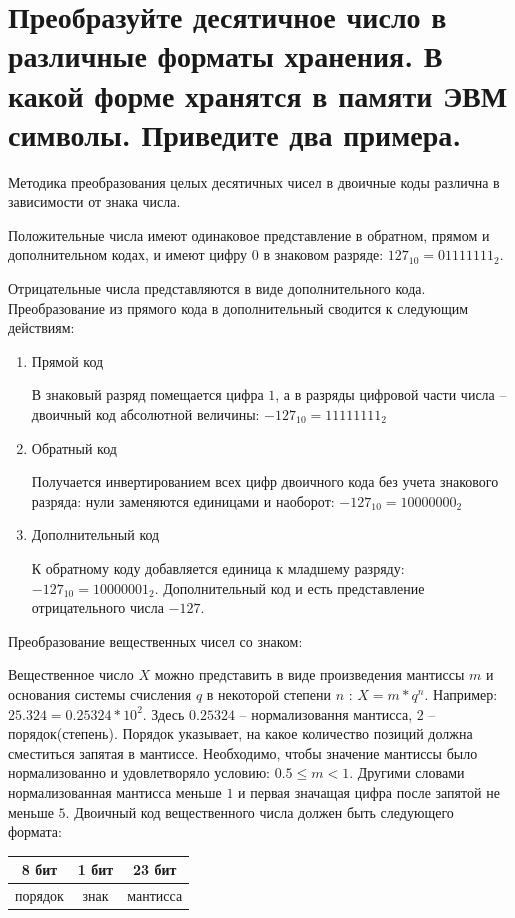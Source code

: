 \documentclass[unicode, 12pt, a4paper, oneside]{article}
\begin{document}
\section{Преобразуйте десятичное число в различные форматы хранения. В какой форме хранятся в памяти ЭВМ символы. Приведите два примера.}

Методика преобразования целых десятичных чисел в двоичные коды различна в зависимости от знака числа.

Положительные числа имеют одинаковое представление в обратном, прямом и дополнительном кодах, и имеют цифру $ 0 $ в знаковом разряде: $ 127_{10}=01111111_{2} $.

Отрицательные числа представляются в виде дополнительного кода. Преобразование из прямого кода в дополнительный сводится к следующим действиям:
\begin{enumerate}
\item Прямой код

В знаковый разряд помещается цифра $ 1 $, а в разряды цифровой части числа – двоичный код абсолютной величины: $ -127_{10}=11111111_{2} $
\item Обратный код

Получается инвертированием всех цифр двоичного кода без учета знакового разряда: нули заменяются единицами и наоборот: $ -127_{10}=10000000_{2} $
\item Дополнительный код

К обратному коду добавляется единица к младшему разряду: $ -127_{10}=10000001_{2} $.
Дополнительный код и есть представление отрицательного числа $ -127 $.
\end{enumerate}  

Преобразование вещественных чисел со знаком:

Вещественное число $ X $ можно представить в виде произведения мантиссы $ m $ и основания системы счисления $ q $ в некоторой степени $ n $ : $ X=m \ast q^{n} $. 
Например: $ 25.324 = 0.25324\ast 10^{2} $. Здесь $ 0.25324 $ – нормализовання мантисса, $ 2 $ – порядок(степень). Порядок указывает, на какое количество позиций должна сместиться запятая в мантиссе. Необходимо, чтобы значение мантиссы было нормализованно и удовлетворяло условию: $ 0.5 \leq m < 1 $. Другими словами нормализованная мантисса меньше $ 1 $ и первая значащая цифра после запятой не меньше $ 5 $. 
Двоичный код вещественного числа должен быть следующего формата:

\begin{center}
\begin{tabular}{|c|c|c|}
\hline 8 бит   & 1 бит & 23 бит   \\ 
\hline порядок & знак  & мантисса \\ 
\hline 
\end{tabular}
\end{center}
 
\end{document}
